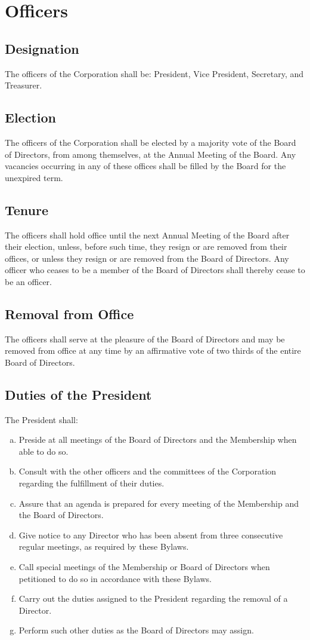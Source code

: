 \section{Officers}

\subsection{Designation}
The officers of the Corporation shall be: President, Vice President,
Secretary, and Treasurer.

\subsection{Election}
The officers of the Corporation shall be elected by a majority vote of
the Board of Directors, from among themselves, at the Annual Meeting
of the Board. Any vacancies occurring in any of these offices shall be
filled by the Board for the unexpired term.

\subsection{Tenure}
The officers shall hold office until the next Annual Meeting of the
Board after their election, unless, before such time, they resign or
are removed from their offices, or unless they resign or are removed
from the Board of Directors. Any officer who ceases to be a member of
the Board of Directors shall thereby cease to be an officer.


\subsection{Removal from Office}
The officers shall serve at the pleasure of the Board of Directors and
may be removed from office at any time by an affirmative vote of two
thirds of the entire Board of Directors.

\subsection{Duties of the President}
The President shall:
\begin{enumerate}[a.]
\item Preside at all meetings of the Board of Directors and the
  Membership when able to do so.
\item Consult with the other officers and the committees of the
  Corporation regarding the fulfillment of their duties.
\item Assure that an agenda is prepared for every meeting of the
  Membership and the Board of Directors.
\item Give notice to any Director who has been absent from three
  consecutive regular meetings, as required by these Bylaws.
\item Call special meetings of the Membership or Board of Directors
  when petitioned to do so in accordance with these Bylaws.
\item Carry out the duties assigned to the President regarding the
  removal of a Director.
\item Perform such other duties as the Board of Directors may assign.
\end{enumerate}

